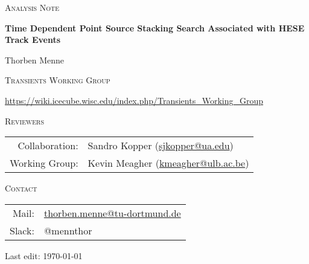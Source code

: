 \begin{titlepage}
  \centering
  {\scshape\Large Analysis Note\par}
  \vspace{1.5cm}
  {\huge\bfseries Time Dependent Point Source Stacking Search Associated with HESE Track Events\par}
  \vspace{2cm}
  {\Large Thorben Menne\par}

  \vfill

  \textsc{Transients Working Group}\par
  \url{https://wiki.icecube.wisc.edu/index.php/Transients_Working_Group}\par
  \vspace{0.5cm}
  \textsc{Reviewers}\par
  \begin{tabular}{rl}
    \centering
    Collaboration: & Sandro Kopper (\href{mailto:sjkopper@ua.edu}{sjkopper@ua.edu}) \\
    Working Group: & Kevin Meagher (\href{mailto:kmeagher@ulb.ac.be}{kmeagher@ulb.ac.be}) \\
  \end{tabular}\par
  \vspace{0.5cm}
  \textsc{Contact}\par
  \begin{tabular}{rl}
    \centering
    Mail: & \href{mailto:thorben.menne@tu-dortmund.de}{thorben.menne@tu-dortmund.de} \\
    Slack: & @mennthor
  \end{tabular}\par
  \vspace{2cm}
  {\Large Last edit: \today\par}
\end{titlepage}